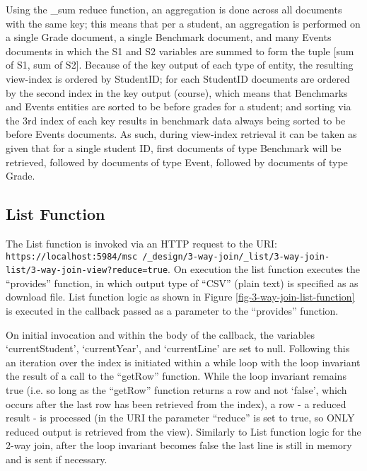 Using the \_sum reduce function, an aggregation is done across all documents with the same key; this means that per a student, an aggregation is performed on a single Grade document, a single Benchmark document, and many Events documents in which the S1 and S2 variables are summed to form the tuple [sum of S1, sum of S2]. Because of the key output of each type of entity, the resulting view-index is ordered by StudentID; for each StudentID documents are ordered by the second index in the key output (course), which means that Benchmarks and Events entities are sorted to be before grades for a student; and sorting via the 3rd index of each key results in benchmark data always being sorted to be before Events documents. As such, during view-index retrieval it can be taken as given that for a single student ID, first documents of type Benchmark will be retrieved, followed by documents of type Event, followed by documents of type Grade.



\subsection{List Function}
The List function is invoked via an HTTP request to the URI: \texttt{https://localhost:5984/msc /\_design/3-way-join/\_list/3-way-join-list/3-way-join-view?reduce=true}. On execution the list function executes the ``provides'' function, in which output type of ``CSV'' (plain text) is specified as as download file. List function logic as shown in Figure \ref{fig-3-way-join-list-function} is executed in the callback passed as a parameter to the ``provides'' function.

On initial invocation and within the body of the callback, the variables `currentStudent', `currentYear', and `currentLine' are set to null. Following this an iteration over the index is initiated within a while loop with the loop invariant the result of a call to the ``getRow'' function. While the loop invariant remains true (i.e. so long as the ``getRow'' function returns a row and not `false', which occurs after the last row has been retrieved from the index), a row - a reduced result - is processed (in the URI the parameter ``reduce'' is set to true, so ONLY reduced output is retrieved from the view). Similarly to List function logic for the 2-way join, after the loop invariant becomes false the last line is still in memory and is sent if necessary.

